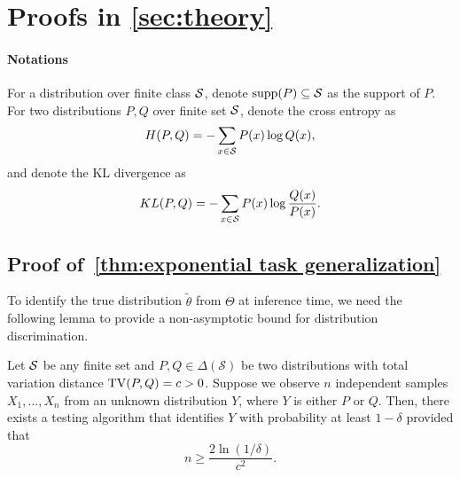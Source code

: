 \newcommand{\supp}{\mathrm{supp}}
\section{Proofs in \cref{sec:theory}}


\paragraph{Notations}
For a distribution over finite class ${\mathcal{S}}$, denote $\supp(P)\subseteq \fS$ as the support of $P$. For two distributions $P,Q$ over finite set ${\mathcal{S}}$, denote the cross entropy as
\begin{align*}
H(P,Q)=-\sum_{x\in {\mathcal{S}} }P(x)\log Q(x),
\end{align*}
and denote the KL divergence as
\begin{align*}
KL(P,Q)=-\sum_{x\in {\mathcal{S}} }P(x)\log \frac{Q(x)}{P(x)}.
\end{align*}



\subsection{Proof of~\cref{thm:exponential task generalization}}\label{appendix:maintheorem}

To identify the true distribution $\tilde\theta$ from $\Theta$ at inference time, we need the following lemma to provide a non-asymptotic bound for distribution discrimination. 



\begin{lemma}\label{lem:dist_discrim}
Let ${\mathcal{S}}$ be any finite set and $P, Q \in \Delta(\mathcal{S})$ be two distributions with total variation distance ${\mathrm{TV}} (P, Q) = c > 0$. Suppose we observe $n$ independent samples $X_1, \dots, X_n$ from an unknown distribution $Y$, where $Y$ is either $P$ or $Q$. Then, there exists a testing algorithm that identifies $Y$ with probability at least $1 - \delta$ provided that 
\[
n \geq \frac{2 \ln(1/\delta)}{c^2}.
\]
\end{lemma}

